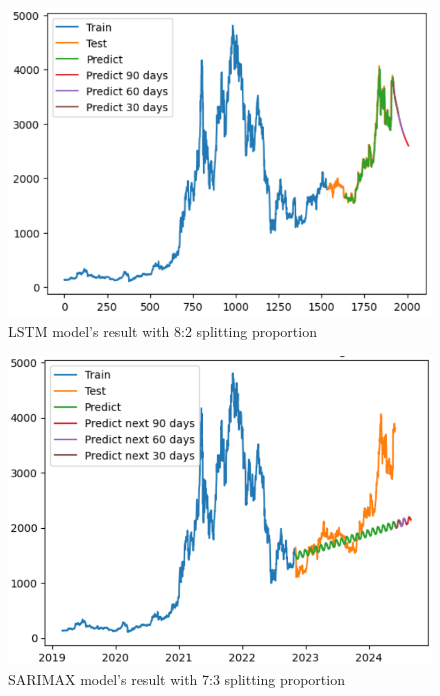 \documentclass{ieeeojies}
\begin{document}
\begin{figure}[H]
	\centering
	\begin{minipage}{0.6\linewidth}
		\centering
		\includegraphics[width=\linewidth]{bibliography/Images/LSTM_ETH_82.PNG}
		\caption{LSTM model's result with 8:2 splitting proportion}
	\end{minipage}
\end{figure}
\begin{figure}[H]
	\centering
	\begin{minipage}{0.6\linewidth}
		\centering
		\includegraphics[width=\linewidth]{bibliography/Images/SARIMAX_ETH_73.PNG}
		\caption{SARIMAX model's result with 7:3 splitting proportion}
	\end{minipage}
\end{figure}
\end{document}
